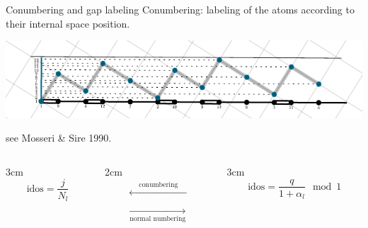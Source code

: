 \documentclass[xcolor=x11names,compress,professionalfonts]{beamer}
\renewcommand{\(}{\begin{columns}}
\renewcommand{\)}{\end{columns}}
\newcommand{\<}[1]{\begin{column}{#1}}
\renewcommand{\>}{\end{column}}
\newcommand{\id}{\ensuremath{\text{idos}}}
\begin{document}
\begin{frame}{Conumbering and gap labeling}
Conumbering: labeling of the atoms according to their internal space position.

{  \centering
     \includegraphics[scale=.9]{img/cut_and_project_perp_projections.pdf}

}
{\flushright
\small{see Mosseri \& Sire 1990.}

}
\(
\<{3cm}
\[
	\id = \frac{j}{N_l}
\]
\>

\<{2cm}
\begin{align*}
	\xleftarrow[]{\text{~~~~conumbering~~~~}} \\
	\xrightarrow[\text{normal numbering}]{}
\end{align*}
\>

\<{3cm}
\[
	\id = \frac{q}{1+\alpha_l} \mod 1
\]
\>
\)

\end{frame}
\end{document}
